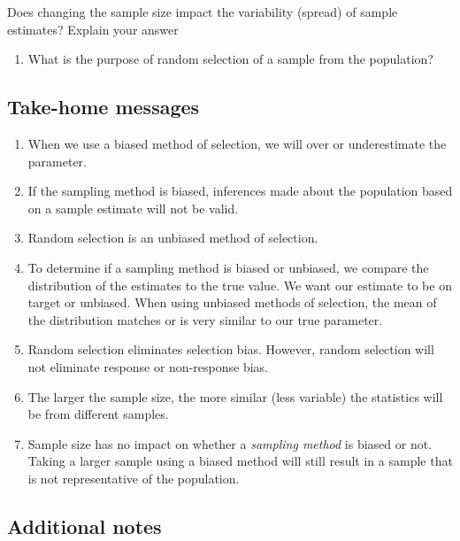 \documentclass[
]{report}
\providecommand{\tightlist}{%
  \setlength{\itemsep}{0pt}\setlength{\parskip}{0pt}}
\newcommand{\rgi}{\hspace{24pt}}  %
\begin{document}
\rgi Does changing the sample size impact the variability (spread) of sample estimates? Explain your answer
\vspace{0.5in}

\begin{enumerate}
\def\labelenumi{\arabic{enumi}.}
\setcounter{enumi}{14}
\tightlist
\item
  What is the purpose of random selection of a sample from the population?
\end{enumerate}

\vspace{0.8in}

\subsection{Take-home messages}\label{take-home-messages-1}

\begin{enumerate}
\def\labelenumi{\arabic{enumi}.}
\item
  When we use a biased method of selection, we will over or underestimate the parameter.
\item
  If the sampling method is biased, inferences made about the population based on a sample estimate will not be valid.
\item
  Random selection is an unbiased method of selection.
\item
  To determine if a sampling method is biased or unbiased, we compare the distribution of the estimates to the true value. We want our estimate to be on target or unbiased. When using unbiased methods of selection, the mean of the distribution matches or is very similar to our true parameter.
\item
  Random selection eliminates selection bias. However, random selection will not eliminate response or non-response bias.
\item
  The larger the sample size, the more similar (less variable) the statistics will be from different samples.
\item
  Sample size has no impact on whether a \emph{sampling method} is biased or not. Taking a larger sample using a biased method will still result in a sample that is not representative of the population.
\end{enumerate}

\subsection{Additional notes}\label{additional-notes-1}
\end{document}
